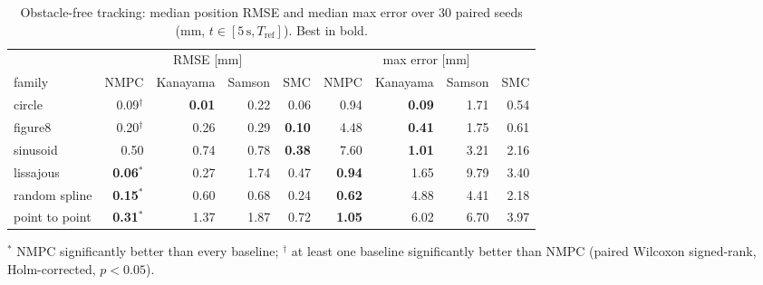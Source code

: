 \begin{table}[!htbp]
\centering\small
\caption{Obstacle-free tracking: median position RMSE and median max error over 30 paired seeds (mm, $t\in[5\,\mathrm{s},T_{\mathrm{ref}}]$). Best in bold.}\label{tab:tracking}
\begin{adjustbox}{max width=\linewidth}
\begin{tabular}{lrrrrrrrr}
\toprule
& \multicolumn{4}{c}{RMSE [mm]} & \multicolumn{4}{c}{max error [mm]} \\
\cmidrule(lr){2-5}\cmidrule(lr){6-9}
family & NMPC & Kanayama & Samson & SMC & NMPC & Kanayama & Samson & SMC \\
\midrule
circle & 0.09$^{\dagger}$ & \textbf{0.01} & 0.22 & 0.06 & 0.94 & \textbf{0.09} & 1.71 & 0.54 \\
figure8 & 0.20$^{\dagger}$ & 0.26 & 0.29 & \textbf{0.10} & 4.48 & \textbf{0.41} & 1.75 & 0.61 \\
sinusoid & 0.50 & 0.74 & 0.78 & \textbf{0.38} & 7.60 & \textbf{1.01} & 3.21 & 2.16 \\
lissajous & \textbf{0.06}$^{*}$ & 0.27 & 1.74 & 0.47 & \textbf{0.94} & 1.65 & 9.79 & 3.40 \\
random spline & \textbf{0.15}$^{*}$ & 0.60 & 0.68 & 0.24 & \textbf{0.62} & 4.88 & 4.41 & 2.18 \\
point to point & \textbf{0.31}$^{*}$ & 1.37 & 1.87 & 0.72 & \textbf{1.05} & 6.02 & 6.70 & 3.97 \\
\bottomrule
\end{tabular}
\end{adjustbox}
\par\smallskip\footnotesize $^{*}$ NMPC significantly better than every baseline; $^{\dagger}$ at least one baseline significantly better than NMPC (paired Wilcoxon signed-rank, Holm-corrected, $p<0.05$).
\end{table}
